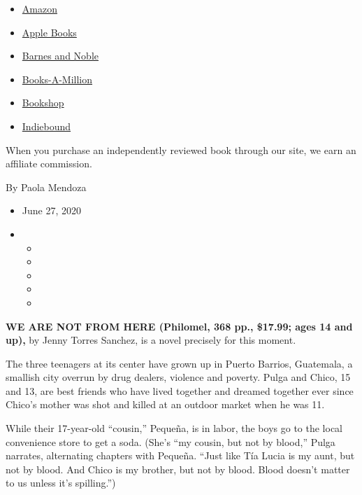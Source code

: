 \begin{itemize}
\tightlist
\item
  \href{https://www.amazon.com/gp/search?index=books\&tag=NYTBSREV-20\&field-keywords=We+Are+Not+From+Here+Jenny+Torres+Sanchez}{Amazon}
\item
  \href{https://du-gae-books-dot-nyt-du-prd.appspot.com/buy?title=We+Are+Not+From+Here\&author=Jenny+Torres+Sanchez}{Apple
  Books}
\item
  \href{https://www.anrdoezrs.net/click-7990613-11819508?url=https\%3A\%2F\%2Fwww.barnesandnoble.com\%2Fw\%2F\%3Fean\%3D9781984812261}{Barnes
  and Noble}
\item
  \href{https://www.anrdoezrs.net/click-7990613-35140?url=https\%3A\%2F\%2Fwww.booksamillion.com\%2Fp\%2FWe\%2BAre\%2BNot\%2BFrom\%2BHere\%2FJenny\%2BTorres\%2BSanchez\%2F9781984812261}{Books-A-Million}
\item
  \href{https://bookshop.org/a/3546/9781984812261}{Bookshop}
\item
  \href{https://www.indiebound.org/book/9781984812261?aff=NYT}{Indiebound}
\end{itemize}

When you purchase an independently reviewed book through our site, we
earn an affiliate commission.

By Paola Mendoza

\begin{itemize}
\item
  June 27, 2020
\item
  \begin{itemize}
  \item
  \item
  \item
  \item
  \item
  \end{itemize}
\end{itemize}

\textbf{WE ARE NOT FROM HERE (Philomel, 368 pp., \$17.99; ages 14 and
up),} by Jenny Torres Sanchez, is a novel precisely for this moment.

The three teenagers at its center have grown up in Puerto Barrios,
Guatemala, a smallish city overrun by drug dealers, violence and
poverty. Pulga and Chico, 15 and 13, are best friends who have lived
together and dreamed together ever since Chico's mother was shot and
killed at an outdoor market when he was 11.

While their 17-year-old ``cousin,'' Pequeña, is in labor, the boys go to
the local convenience store to get a soda. (She's ``my cousin, but not
by blood,'' Pulga narrates, alternating chapters with Pequeña. ``Just
like Tía Lucia is my aunt, but not by blood. And Chico is my brother,
but not by blood. Blood doesn't matter to us unless it's spilling.'')

